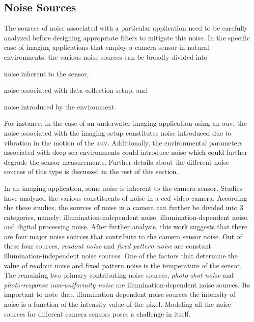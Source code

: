 \documentclass {udthesis}
\begin{document}
\subsection{Noise Sources}
\label{sec:noise_sources}

The sources of noise associated with a particular  application need to be carefully analyzed before designing appropriate filters to mitigate this noise.
In the specific case of imaging applications that employ a camera sensor in natural environments, the various noise sources can be broadly divided
into \begin{enumerate*}[label=(\roman*)] \item noise inherent to the sensor, \item noise associated with data collection setup, and \item noise introduced by the environment. \end{enumerate*} For instance, in the case of an underwater imaging application using an \gls{auv}, the noise associated with the imaging setup constitutes noise introduced due to vibration in the motion of the \gls{auv}. Additionally, the environmental parameters associated with deep sea environments could introduce noise which could further degrade the sensor measurements. Further details about the different noise sources of this type is discussed in the rest of this section.

In an imaging application, some noise is inherent to the camera sensor. Studies \cite{irie} have analyzed the various constituents of noise 
in a \gls{ccd} video-camera. According the these studies, the sources of noise in a camera can further be divided into 3 categories, namely: illumination-independent noise, illumination-dependent noise, and digital processing noise. After further analysis, this work suggests that there are four major noise sources that contribute to the camera sensor noise. Out of these four sources, \emph{readout noise} and \emph{fixed pattern noise} are constant illumination-independent noise sources. One of the factors that determine the value of readout noise and fixed pattern noise is the temperature of the sensor. The remaining two primary contributing noise sources, \emph{photo-shot noise} and \emph{photo-response non-uniformity noise} are illumination-dependent noise sources. Its important to note that, illumination dependent noise sources the intensity of noise is a function of the intensity value of the pixel. Modeling all the noise sources for different camera sensors poses a challenge in itself.
\end{document}
